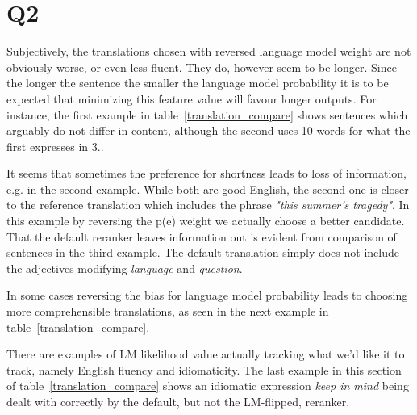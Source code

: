\section*{Q2}

Subjectively, the translations chosen with reversed language model weight are not obviously worse, or even less fluent. They do, however seem to be longer. Since the longer the sentence the smaller the language model probability it is to be expected that minimizing this feature value will favour longer outputs. For instance, the first example in table~\ref{translation_compare} shows sentences which arguably do not differ in content, although the second uses 10 words for what the first expresses in 3..

It seems that sometimes the preference for shortness leads to loss of information, e.g. in the second example. While both are good English, the second one is closer to the reference translation which includes the phrase \textit{"this summer's tragedy"}. In this example by reversing the p(e) weight we actually choose a better candidate. That the default reranker leaves information out is evident from comparison of sentences in the third example. The default translation simply does not include the adjectives modifying \textit{language} and \textit{question}.

In some cases reversing the bias for language model probability leads to choosing more comprehensible translations, as seen in the next example in table~\ref{translation_compare}.

There are examples of LM likelihood value actually tracking what we'd like it to track, namely English fluency and idiomaticity. The last example in this section of table~\ref{translation_compare} shows an idiomatic expression \textit{keep in mind} being dealt with correctly by the default, but not the LM-flipped, reranker.
